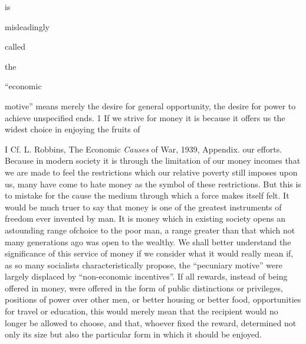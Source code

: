\documentclass[11pt,openany]{book}
\begin{document}
is

misleadingly

called

the

``economic

motive'' means merely the desire for general opportunity, the desire for power to achieve unspecified ends. 1 If we strive for money it is because it offers us the widest choice in enjoying the fruits of

I Cf. L. Robbins, The Economic \emph{Causes} of War, 1939, Appendix. our efforts. Because in modern society it is through the limitation of our money incomes that we are made to feel the restrictions which our relative poverty still imposes upon us, many have come to hate money as the symbol of these restrictions. But this is to mistake for the cause the medium through which a force makes itself felt. It would be much truer to say that money is one of the greatest instruments of freedom ever invented by man. It is money which in existing society opens an astounding range ofchoice to the poor man, a range greater than that which not many generations ago was open to the wealthy. We shall better understand the significance of this service of money if we consider what it would really mean if, as so many socialists characteristically propose, the ``pecuniary motive'' were largely displaced by ``non-economic incentives''. If all rewards, instead of being offered in money, were offered in the form of public distinctions or privileges, positions of power over other men, or better housing or better food, opportunities for travel or education, this would merely mean that the recipient would no longer be allowed to choose, and that, whoever fixed the reward, determined not only its size but also the particular form in which it should be enjoyed.

\begin{center}\textasteriskcentered\hspace{0.9em}\textasteriskcentered\hspace{0.9em}\textasteriskcentered\end{center}

\begin{center}\textasteriskcentered\hspace{0.9em}\textasteriskcentered\hspace{0.9em}\textasteriskcentered\end{center}

\begin{center}\textasteriskcentered\hspace{0.9em}\textasteriskcentered\hspace{0.9em}\textasteriskcentered\end{center}
\end{document}
